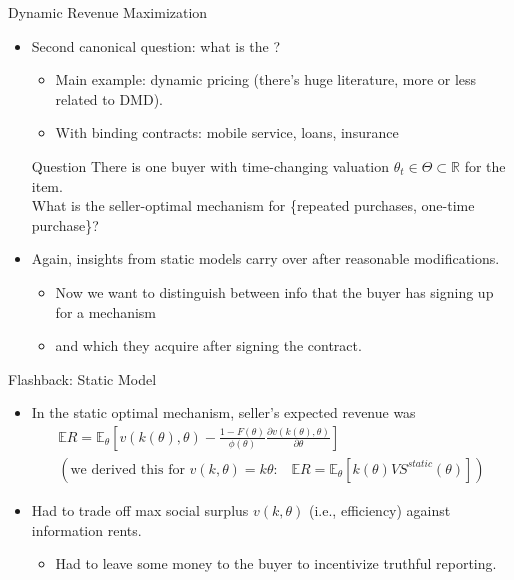 \documentclass[english,10pt
,aspectratio=169
]{beamer}
\begin{document}
\begin{frame}{Dynamic Revenue Maximization}
\begin{itemize}
	\item Second canonical question: what is the ?
	\begin{itemize}
		\item Main example: dynamic pricing (there's huge literature, more or less related to DMD).
		\item With binding contracts: mobile service, loans, insurance
	\end{itemize}
	\begin{block}{Question}
		There is one buyer with time-changing valuation $\theta_t \in \Theta \subset \mathbb{R}$ for the item. \\
		What is the seller-optimal mechanism for \{repeated purchases, one-time purchase\}?
	\end{block}
	\item Again, insights from static models carry over after reasonable modifications.
	\begin{itemize}
		\item Now we want to distinguish between info that the buyer has  signing up for a mechanism
		\item and which they acquire \alert{after} signing the contract.
	\end{itemize}
\end{itemize}
\end{frame}


\begin{frame}{Flashback: Static Model}
\begin{itemize}
	\item In the static optimal mechanism, seller's expected revenue was
	\begin{gather*}
		\mathbb{E}R = \mathbb{E}_\theta \left[ v(k(\theta),\theta) - \frac{1-F(\theta)}{\phi(\theta)} \frac{\partial v(k(\theta),\theta)}{\partial \theta} \right]
		\\
		\left(\text{we derived this for $v(k,\theta) = k\theta$:} \quad 
		\mathbb{E}R = \mathbb{E}_\theta \left[ k(\theta) VS^{static}(\theta) \right] \right)
	\end{gather*}
	\item Had to trade off max social surplus $v(k,\theta)$ (i.e., efficiency) against information rents.
	\begin{itemize}
		\item Had to leave some money to the buyer to incentivize truthful reporting.
	\end{itemize}
\end{itemize}
\end{frame}
\end{document}
